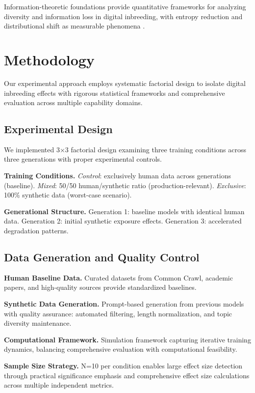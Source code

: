 \documentclass{article}
\begin{document}
Information-theoretic foundations \citep{shannon1948mathematical, cover1999elements} provide quantitative frameworks for analyzing diversity and information loss in digital inbreeding, with entropy reduction and distributional shift as measurable phenomena \citep{hoffmann2022training}.

\section{Methodology}

Our experimental approach employs systematic factorial design to isolate digital inbreeding effects with rigorous statistical frameworks and comprehensive evaluation across multiple capability domains.

\subsection{Experimental Design}

We implemented 3×3 factorial design examining three training conditions across three generations with proper experimental controls.

\textbf{Training Conditions.} \textit{Control}: exclusively human data across generations (baseline). \textit{Mixed}: 50/50 human/synthetic ratio (production-relevant). \textit{Exclusive}: 100\% synthetic data (worst-case scenario).

\textbf{Generational Structure.} Generation 1: baseline models with identical human data. Generation 2: initial synthetic exposure effects. Generation 3: accelerated degradation patterns.

\subsection{Data Generation and Quality Control}

\textbf{Human Baseline Data.} Curated datasets from Common Crawl, academic papers, and high-quality sources provide standardized baselines.

\textbf{Synthetic Data Generation.} Prompt-based generation from previous models with quality assurance: automated filtering, length normalization, and topic diversity maintenance.

\textbf{Computational Framework.} Simulation framework capturing iterative training dynamics, balancing comprehensive evaluation with computational feasibility.

\textbf{Sample Size Strategy.} N=10 per condition enables large effect size detection through practical significance emphasis and comprehensive effect size calculations across multiple independent metrics.
\end{document}
